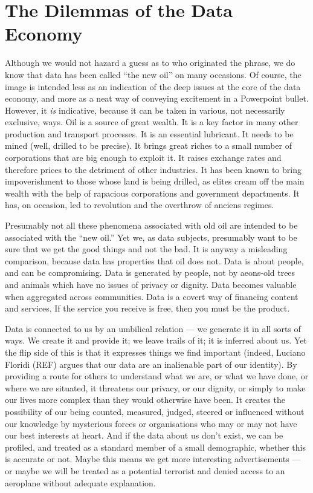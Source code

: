 \documentclass[runningheads,a4paper]{llncs}
\begin{document}
\section{The Dilemmas of the Data Economy}

Although we would not hazard a guess as to who originated the phrase, we do know that data has been called ``the new oil'' on many occasions. Of course, the image is intended less as an indication of the deep issues at the core of the data economy, and more as a neat way of conveying excitement in a Powerpoint bullet. However, it {\em is} indicative, because it can be taken in various, not necessarily exclusive, ways. Oil is a source of great wealth. It is a key factor in many other production and transport processes. It is an essential lubricant. It needs to be mined (well, drilled to be precise). It brings great riches to a small number of corporations that are big enough to exploit it. It raises exchange rates and therefore prices to the detriment of other industries. It has been known to bring impoverishment to those whose land is being drilled, as elites cream off the main wealth with the help of rapacious corporations and government departments. It has, on occasion, led to revolution and the overthrow of anciens regimes.

Presumably not all these phenomena associated with old oil are intended to be associated with the ``new oil.'' Yet we, as data subjects, presumably want to be sure that we get the good things and not the bad. It is anyway a misleading comparison, because data has properties that oil does not. Data is about people, and can be compromising. Data is generated by people, not by aeons-old trees and animals which have no issues of privacy or dignity. Data becomes valuable when aggregated across communities. Data is a covert way of financing content and services. If the service you receive is free, then you must be the product.

Data is connected to us by an umbilical relation --- we generate it in all sorts of ways. We create it and provide it; we leave trails of it; it is inferred about us. Yet the flip side of this is that it expresses things we find important (indeed, Luciano Floridi (REF) argues that our data are an inalienable part of our identity). By providing a route for others to understand what we are, or what we have done, or where we are situated, it threatens our privacy, or our dignity, or simply to make our lives more complex than they would otherwise have been. It creates the possibility of our being counted, measured, judged, steered or influenced without our knowledge by mysterious forces or organisations who may or may not have our best interests at heart. And if the data about us don't exist, we can be profiled, and treated as a standard member of a small demographic, whether this is accurate or not. Maybe this means we get more interesting advertisements --- or maybe we will be treated as a potential terrorist and denied access to an aeroplane without adequate explanation.
\end{document}
